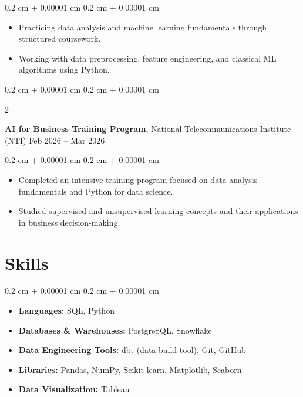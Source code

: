 \documentclass[10pt, letterpaper]{article}
\newenvironment{highlights}{
    \begin{itemize}[
        topsep=0.10 cm,
        parsep=0.10 cm,
        partopsep=0pt,
        itemsep=0pt,
        leftmargin=0.4 cm + 10pt
    ]
}{
    \end{itemize}
} %
\newenvironment{highlightsforbulletentries}{
    \begin{itemize}[
        topsep=0.10 cm,
        parsep=0.10 cm,
        partopsep=0pt,
        itemsep=0pt,
        leftmargin=10pt
    ]
}{
    \end{itemize}
} %
\newenvironment{onecolentry}{
    \begin{adjustwidth}{
        0.2 cm + 0.00001 cm
    }{
        0.2 cm + 0.00001 cm
    }
}{
    \end{adjustwidth}
} %
\newenvironment{twocolentry}[2][]{
    \onecolentry
    \def\secondColumn{#2}
    \setcolumnwidth{\fill, 4.5 cm}
    \begin{paracol}{2}
}{
    \switchcolumn \raggedleft \secondColumn
    \end{paracol}
    \endonecolentry
} %
\begin{document}
        \vspace{0.10 cm}
        \begin{onecolentry}
            \begin{highlights}
                \item Practicing data analysis and machine learning fundamentals through structured coursework.
                \item Working with data preprocessing, feature engineering, and classical ML algorithms using Python.
            \end{highlights}
        \end{onecolentry}

        \vspace{0.2 cm}

        \begin{twocolentry}{
            Feb 2026 – Mar 2026
        }
            \textbf{AI for Business Training Program}, National Telecommunications Institute (NTI)\end{twocolentry}

        \vspace{0.10 cm}
        \begin{onecolentry}
            \begin{highlights}
                \item Completed an intensive training program focused on data analysis fundamentals and Python for data science.
                \item Studied supervised and unsupervised learning concepts and their applications in business decision-making.
            \end{highlights}
        \end{onecolentry}

    \section{Skills}

        \begin{onecolentry}
            \begin{highlightsforbulletentries}
                \item \textbf{Languages:} SQL, Python
                \item \textbf{Databases \& Warehouses:} PostgreSQL, Snowflake
                \item \textbf{Data Engineering Tools:} dbt (data build tool), Git, GitHub
                \item \textbf{Libraries:} Pandas, NumPy, Scikit-learn, Matplotlib, Seaborn
                \item \textbf{Data Visualization:} Tableau
            \end{highlightsforbulletentries}
        \end{onecolentry}
\end{document}
